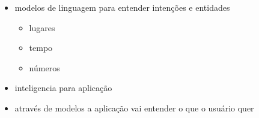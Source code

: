 
\begin{itemize}
	\item modelos de linguagem para entender intenções e entidades
		\begin{itemize}
			\item lugares
			\item tempo
			\item números
		\end{itemize}
	\item inteligencia para aplicação
	\item através de modelos a aplicação vai entender o que o usuário quer
\end{itemize}
